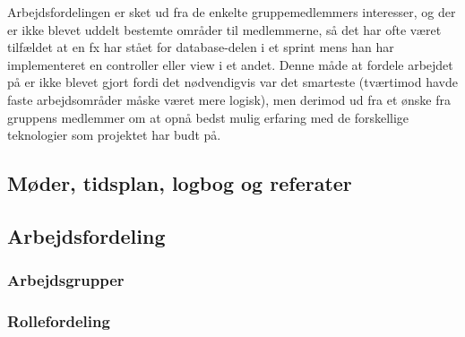 Arbejdsfordelingen er sket ud fra de enkelte gruppemedlemmers interesser, og der er ikke blevet uddelt bestemte områder til medlemmerne, så det har ofte været tilfældet at en fx har stået for database-delen i et sprint mens han har implementeret en controller eller view i et andet. Denne måde at fordele arbejdet på er ikke blevet gjort fordi det nødvendigvis var det smarteste (tværtimod havde faste arbejdsområder måske været mere logisk), men derimod ud fra et ønske fra gruppens medlemmer om at opnå bedst mulig erfaring med de forskellige teknologier som projektet har budt på.


\subsection{Møder, tidsplan, logbog og referater}

\subsection{Arbejdsfordeling}

\subsubsection{Arbejdsgrupper}

\subsubsection{Rollefordeling}
